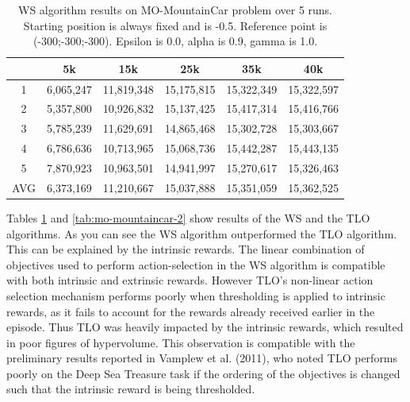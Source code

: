 \begin{table}[t]
\centering
\def\arraystretch{1.5}
\begin{tabular}{|c|c|c|c|c|c|}
  \hline
  & 5k & 15k & 25k & 35k & 40k \\
  \hline
  1 & 6,065,247 & 11,819,348 & 15,175,815 & 15,322,349 & 15,322,597 \\
  \hline
  2 & 5,357,800 & 10,926,832 & 15,137,425 & 15,417,314 & 15,416,766 \\
  \hline
  3 & 5,785,239 & 11,629,691 & 14,865,468 & 15,302,728 & 15,303,667 \\
  \hline
  4 & 6,786,636 & 10,713,965 & 15,068,736 & 15,442,287 & 15,443,135 \\
  \hline
  5 & 7,870,923 & 10,963,501 & 14,941,997 & 15,270,617 & 15,326,463 \\
  \hline
  AVG & 6,373,169 & 11,210,667 & 15,037,888 & 15,351,059 & 15,362,525 \\
  \hline      
\end{tabular}
\caption{WS algorithm results on MO-MountainCar problem over 5 runs. Starting position is always fixed and is -0.5. Reference point is (-300;-300;-300). Epsilon is 0.0, alpha is 0.9, gamma is 1.0.}
\label{tab:mo-mountaincar-1}
\end{table}

Tables \ref{tab:mo-mountaincar-1} and \ref{tab:mo-mountaincar-2} show results of the WS and the TLO algorithms. As you can see the WS algorithm outperformed the TLO algorithm. This can be explained by the intrinsic rewards. The linear combination of objectives used to perform action-selection in the WS algorithm is compatible with both intrinsic and extrinsic rewards. However TLO’s non-linear action selection mechanism performs poorly when thresholding is applied to intrinsic rewards, as it fails to account for the rewards already received earlier in the episode. Thus TLO was heavily impacted by the intrinsic rewards, which resulted in poor figures of hypervolume. This observation is compatible with the preliminary results reported in Vamplew et al. (2011)\nocite{vamplew2011empirical}, who noted TLO performs poorly on the Deep Sea Treasure task if the ordering of the objectives is changed such that the intrinsic reward is being thresholded.

